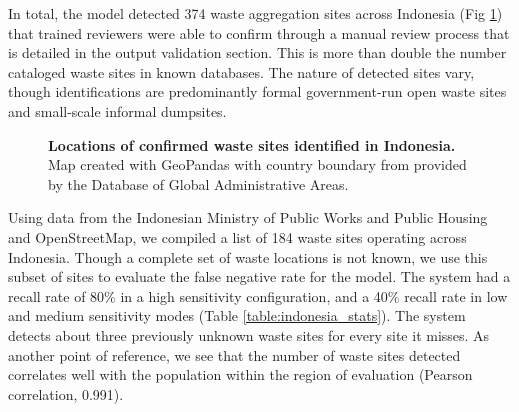 \documentclass[10pt,letterpaper]{article}
\begin{document}
In total, the model detected 374 waste aggregation sites across Indonesia (Fig \ref{fig:indonesia_locations}) that trained reviewers were able to confirm through a manual review process that is detailed in the output validation section. This is more than double the number cataloged waste sites in known databases. The nature of detected sites vary, though identifications are predominantly formal government-run open waste sites and small-scale informal dumpsites.

\begin{figure}[!h]
    \caption{{\bf Locations of confirmed waste sites identified in Indonesia.}
    Map created with GeoPandas \cite{kelsey_jordahl_2020_3946761} with country boundary from provided by the Database of Global Administrative Areas.}
    \label{fig:indonesia_locations}
\end{figure}

Using data from the Indonesian Ministry of Public Works and Public Housing \cite{astinfra} and OpenStreetMap, we compiled a list of 184 waste sites operating across Indonesia. Though a complete set of waste locations is not known, we use this subset of sites to evaluate the false negative rate for the model. The system had a recall rate of 80\% in a high sensitivity configuration, and a 40\% recall rate in low and medium sensitivity modes (Table \ref{table:indonesia_stats}). The system detects about three previously unknown waste sites for every site it misses. As another point of reference, we see that the number of waste sites detected correlates well with the population within the region of evaluation (Pearson correlation, 0.991).

\newcommand{\specialcell}[2][b]{%
  \begin{tabular}[#1]{@{}c@{}}#2\end{tabular}}

\newcommand{\specialcellc}[2][c]{%
  \begin{tabular}[#1]{@{}c@{}}#2\end{tabular}}
\end{document}
